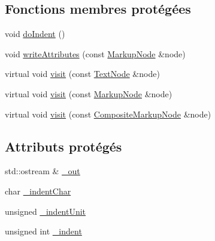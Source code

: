 \subsection*{Fonctions membres protégées}
\begin{DoxyCompactItemize}
\item 
void \hyperlink{classxml_1_1_output_visitor_af369ea5f7984975e7dfdea89ddcae000}{doIndent} ()
\item 
void \hyperlink{classxml_1_1_output_visitor_a3c1d2ac6dec2c9f6279a59226646e254}{writeAttributes} (const \hyperlink{classxml_1_1_markup_node}{MarkupNode} \&node)
\item 
virtual void \hyperlink{classxml_1_1_output_visitor_a33e53f866b31a155bbf29ffda852aaf7}{visit} (const \hyperlink{classxml_1_1_text_node}{TextNode} \&node)
\item 
virtual void \hyperlink{classxml_1_1_output_visitor_ac1dae5dbb561c4b7e98a761d5d503e49}{visit} (const \hyperlink{classxml_1_1_markup_node}{MarkupNode} \&node)
\item 
virtual void \hyperlink{classxml_1_1_output_visitor_addfc73ae3643a8285b5f892eff1a6066}{visit} (const \hyperlink{classxml_1_1_composite_markup_node}{CompositeMarkupNode} \&node)
\end{DoxyCompactItemize}
\subsection*{Attributs protégés}
\begin{DoxyCompactItemize}
\item 
std::ostream \& \hyperlink{classxml_1_1_output_visitor_ab2e31d8a9675f88d96a89399ea894e83}{\_\-out}
\item 
char \hyperlink{classxml_1_1_output_visitor_a9b89adad1ba1e3ff2f64ad7cd6545361}{\_\-indentChar}
\item 
unsigned \hyperlink{classxml_1_1_output_visitor_a55060d8246a1365089872aa4a500b03c}{\_\-indentUnit}
\item 
unsigned int \hyperlink{classxml_1_1_output_visitor_a7664b7975557ab6db96b744bf43190f4}{\_\-indent}
\end{DoxyCompactItemize}
